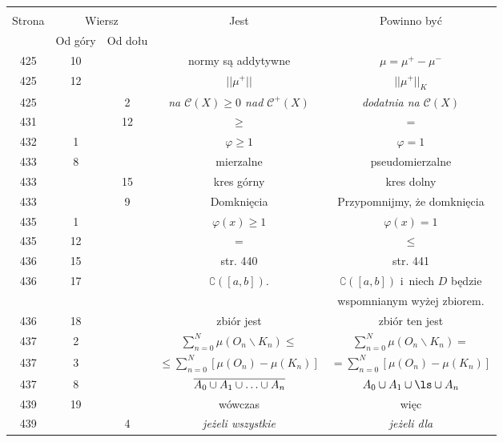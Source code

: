 \documentclass[a4paper,11pt]{article}
\newcommand{\ld}{\ldots}
\newcommand{\bs}{\backslash}
\begin{document}
\begin{center}
  \begin{tabular}{|c|c|c|c|c|}
    \hline
    & \multicolumn{2}{c|}{} & & \\
    Strona & \multicolumn{2}{c|}{Wiersz}& Jest & Powinno być \\ \cline{2-3}
    & Od góry & Od dołu &  &  \\ \hline
    425 & 10 & & normy są addytywne & $\mu = \mu^{ + } - \mu^{ - }$ \\
    425 & 12 & & $|| \mu^{ + } ||$ & $|| \mu^{ + } ||_{ K }$ \\
    425 & &  2 & \emph{na $\mathcal{C}( X ) \geq 0$ nad
                 $\mathcal{C}^{ + }( X )$} 
           & \emph{dodatnia na $\mathcal{C}( X )$} \\
    431 & & 12 & $\geq$ & $=$ \\
    432 &  1 & & $\varphi \geq 1$ & $\varphi = 1$ \\
    433 &  8 & & mierzalne & pseudomierzalne \\
    433 & & 15 & kres górny & kres dolny \\
    433 & &  9 & Domknięcia & Przypomnijmy, że domknięcia \\
    435 &  1 & & $\varphi( x ) \geq 1$ & $\varphi( x ) = 1$ \\
    435 & 12 & & $=$ & $\leq$ \\
    436 & 15 & & str. 440 & str. 441 \\
    436 & 17 & & $\complement ( [ a, b ] )$. & $\complement ( [ a, b ] )$
                                               i~niech $D$ będzie \\
    & & & & wspomnianym wyżej zbiorem. \\
    436 & 18 & & zbiór jest & zbiór ten jest \\
    437 &  2 & & $\sum\limits^{ N }_{ n = 0 } \mu( O_{ n } \bs
                 K_{ n } ) \leq$ & $\sum\limits^{ N }_{ n = 0 }
                                   \mu( O_{ n } \backslash K_{ n } ) =$ \\
    437 &  3 & & $\leq \sum\limits^{ N }_{ n = 0 } [ \mu( O_{ n } )
                 - \mu( K_{ n } ) ]$ 
           & $= \sum\limits^{ N }_{ n = 0 } [ \mu( O_{ n } ) 
             - \mu( K_{ n } ) ]$ \\
    437 &  8 & & $\ol{ A_{ 0 } \cup A_{ 1 } \cup \ld \cup A_{ n } }$
           & $A_{ 0 } \cup A_{ 1 } \cup \ls \cup A_{ n }$ \\
    439 & 19 & & wówczas & więc \\
    439 & &  4 & \emph{jeżeli wszystkie} & \emph{jeżeli dla
}
\end{tabular}
\end{center}
\end{document}
